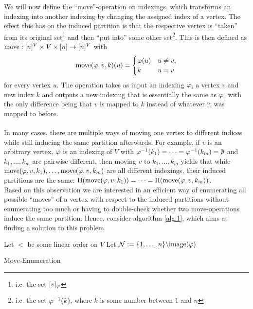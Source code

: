 We will now define the ``move''-operation on indexings, which transforms an indexing into another indexing by changing the assigned index of a vertex. The effect this has on the induced partition is that the respective vertex is ``taken'' from its original set\footnote{i.e. the set $[v]_\varphi$} and then ``put into'' some other set\footnote{i.e. the set $\varphi^{-1}(k)$, where $k$ is some number between $1$ and $n$}. This is then defined as $\mathrm{move}: [n]^V \times V \times [n] \rightarrow [n]^V$ with 
\begin{equation} 
\mathrm{move}(\varphi, v, k)(u) = \begin{cases}
    \varphi(u) & u \neq v, \\ 
    k & u = v
\end{cases} \label{eq:move-operation}
\end{equation} 
for every vertex $u$. The operation takes as input an indexing $\varphi$, a vertex $v$ and new index $k$ and outputs a new indexing that is essentially the same as $\varphi$, with the only difference being that $v$ is mapped to $k$ instead of whatever it was mapped to before.
\\ \\
In many cases, there are multiple ways of moving one vertex to different indices while still inducing the same partition afterwards. For example, if $v$ is an arbitrary vertex, $\varphi$ is an indexing of $V$ with $\varphi^{-1}(k_1) = \dots = \varphi^{-1}(k_m) = \emptyset$ and $k_1,\dots,k_m$ are pairwise different, then moving $v$ to $k_1,\dots,k_m$ yields that while $\mathrm{move}(\varphi,v,k_1),\dots,\mathrm{move}(\varphi,v,k_m)$ are all different indexings, their induced partitions are the same: $\Pi(\mathrm{move}(\varphi,v,k_1)) = \dots = \Pi(\mathrm{move}(\varphi,v,k_m))$.
\\ 
Based on this observation we are interested in an efficient way of enumerating all possible ``moves'' of a vertex with respect to the induced partitions without enumerating too much or having to double-check whether two move-operations induce the same partition. Hence, consider algorithm \ref{alg:1}, which aims at finding a solution to this problem.

\begin{algorithm}[H]
    \SetAlgoLined
    Let $<$ be some linear order on $V$ \;
    Let $\mathcal{N} := \{1,\dots,n\}\backslash \mathrm{image}(\varphi)$ \;
    \caption{Move-Enumeration} \label{alg:1}
\end{algorithm}

